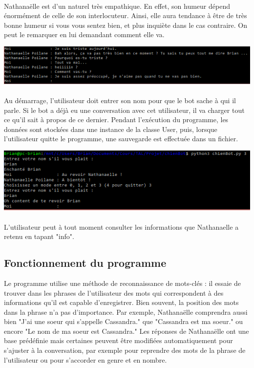 \documentclass[paper=a4, fontsize=11pt]{article}
\begin{document}
\paragraph{} Nathanaëlle est d'un naturel très empathique. En effet, son humeur dépend énormément de celle de son interlocuteur. Ainsi, elle aura tendance à être de très bonne humeur si vous vous sentez bien, et plus inquiète dans le cas contraire. On peut le remarquer en lui demandant comment elle va.
\begin{center}
\includegraphics{empathie.PNG} 
\end{center}
\paragraph{} Au démarrage, l'utilisateur doit entrer son nom pour que le bot sache à qui il parle. Si le bot a déjà eu une conversation avec cet utilisateur, il va charger tout ce qu'il sait à propos de ce dernier. Pendant l'exécution du programme, les données sont stockées dans une instance de la classe User, puis, lorsque l'utilisateur quitte le programme, une sauvegarde est effectuée dans un fichier.
\begin{center}
\includegraphics{reload.PNG}
\end{center}
\paragraph{} L'utilisateur peut à tout moment consulter les informations que Nathanaelle a retenu en tapant "info".

\subsection{Fonctionnement du programme}

Le programme utilise une méthode de reconnaissance de mots-clés : il essaie de trouver dans les phrases de l'utilisateur des mots qui correspondent à des informations qu'il est capable d'enregistrer. Bien souvent, la position des mots dans la phrase n'a pas d'importance. Par exemple, Nathanaëlle comprendra aussi bien "J'ai une soeur qui s'appelle Cassandra." que "Cassandra est ma soeur." ou encore "Le nom de ma soeur est Cassandra." Les réponses de Nathanaëlle ont une base prédéfinie mais certaines peuvent être modifiées automatiquement pour s'ajuster à la conversation, par exemple pour reprendre des mots de la phrase de l'utilisateur ou pour s'accorder en genre et en nombre.
\end{document}
